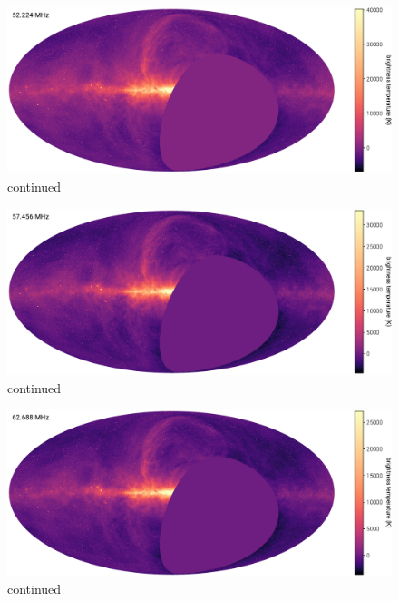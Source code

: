 \begin{bibunit}
\addtocounter{figure}{-1}
\begin{figure}
    \centering
    \includegraphics[width=\textwidth]{figures/chapter3/spw10}
    \caption{
        continued
    }
\end{figure}

\addtocounter{figure}{-1}
\begin{figure}
    \centering
    \includegraphics[width=\textwidth]{figures/chapter3/spw12}
    \caption{
        continued
    }
\end{figure}

\addtocounter{figure}{-1}
\begin{figure}
    \centering
    \includegraphics[width=\textwidth]{figures/chapter3/spw14}
    \caption{
        continued
    }
\end{figure}


\end{bibunit}
